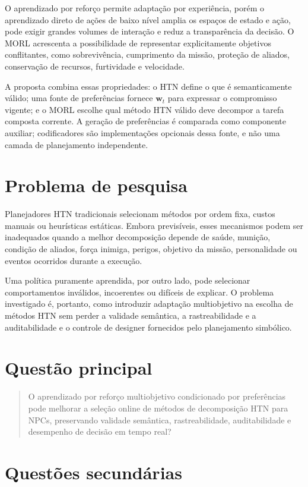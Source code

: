 O aprendizado por reforço permite adaptação por experiência, porém o
aprendizado direto de ações de baixo nível amplia os espaços de estado e ação,
pode exigir grandes volumes de interação e reduz a transparência da decisão.
O MORL acrescenta a possibilidade de representar explicitamente objetivos
conflitantes, como sobrevivência, cumprimento da missão, proteção de aliados,
conservação de recursos, furtividade e velocidade.

A proposta combina essas propriedades: o HTN define o que é semanticamente
válido; uma fonte de preferências fornece $\mathbf{w}_t$ para expressar o
compromisso vigente; e o MORL escolhe qual método HTN válido deve decompor a
tarefa composta corrente.
A geração de preferências é comparada como componente auxiliar; codificadores
são implementações opcionais dessa fonte, e não uma camada de planejamento
independente.

\section{Problema de pesquisa}

Planejadores HTN tradicionais selecionam métodos por ordem fixa, custos
manuais ou heurísticas estáticas.
Embora previsíveis, esses mecanismos podem ser inadequados quando a melhor
decomposição depende de saúde, munição, condição de aliados, força inimiga,
perigos, objetivo da missão, personalidade ou eventos ocorridos durante a execução.

Uma política puramente aprendida, por outro lado, pode selecionar
comportamentos inválidos, incoerentes ou difíceis de explicar.
O problema investigado é, portanto, como introduzir adaptação multiobjetivo na
escolha de métodos HTN sem perder a validade semântica, a rastreabilidade e a auditabilidade
e o controle de designer fornecidos pelo planejamento simbólico.

\section{Questão principal}

\begin{quote}
O aprendizado por reforço multiobjetivo condicionado por preferências pode
melhorar a seleção online de métodos de decomposição HTN para NPCs, preservando
validade semântica, rastreabilidade, auditabilidade e desempenho de decisão em tempo real?
\end{quote}

\section{Questões secundárias}

